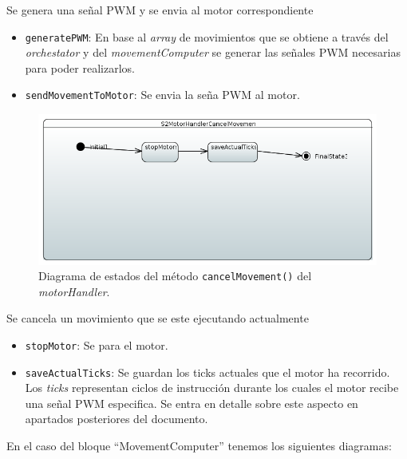 Se genera una señal PWM y se envia al motor correspondiente

\begin{itemize}
    \item \texttt{generatePWM}: En base al \textit{array} de movimientos que se obtiene a través del \textit{orchestator} y del \textit{movementComputer} se generar las señales PWM necesarias para poder realizarlos.
    
    \item \texttt{sendMovementToMotor}: Se envia la seña PWM al motor.

\end{itemize}

\begin{figure}[H]
    \centering
    \includegraphics[width=1\linewidth]{pictures/S2MotorHandlerCancelMovement.PNG}
    \caption{Diagrama de estados del método \texttt{cancelMovement()} del \textit{motorHandler}.}
    \label{fig:fun_cancel_movement_motor_handler}
\end{figure}

Se cancela un movimiento que se este ejecutando actualmente

\begin{itemize}
    \item \texttt{stopMotor}: Se para el motor.
    \item \texttt{saveActualTicks}: Se guardan los ticks actuales que el motor ha recorrido. Los \textit{ticks} representan ciclos de instrucción durante los cuales el motor recibe una señal PWM especifica. Se entra en detalle sobre este aspecto en apartados posteriores del documento.

\end{itemize}

En el caso del bloque “MovementComputer” tenemos los siguientes diagramas:

